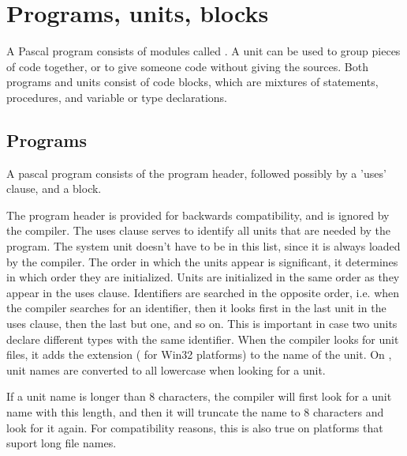 \documentclass{report}
\begin{document}

\chapter{Programs, units, blocks}
A Pascal program consists of modules called . A unit can be used
to group pieces of code together, or to give someone code without giving
the sources.
Both programs and units consist of code blocks, which are mixtures of
statements, procedures, and variable or type declarations.

\section{Programs}
A pascal program consists of the program header, followed possibly by a
'uses' clause, and a block.

The program header is provided for backwards compatibility, and is ignored
by the compiler.
The uses clause serves to identify all units that are needed by the program.
The system unit doesn't have to be in this list, since it is always loaded
by the compiler.
The order in which the units appear is significant, it determines in
which order they are initialized. Units are initialized in the same order
as they appear in the uses clause. Identifiers are searched in the opposite
order, i.e. when the compiler searches for an identifier, then it looks
first in the last unit in the uses clause, then the last but one, and so on.
This is important in case two units declare different types with the same
identifier.
When the compiler looks for unit files, it adds the extension 
( for Win32 platforms) to the name of the unit. On \linux, unit names
are converted to all lowercase when looking for a unit.

If a unit name is longer than 8 characters, the compiler will first look for
a unit name with this length, and then it will truncate the name to 8
characters and look for it again. For compatibility reasons, this is also 
true on platforms that suport long file names.

\end{document}
